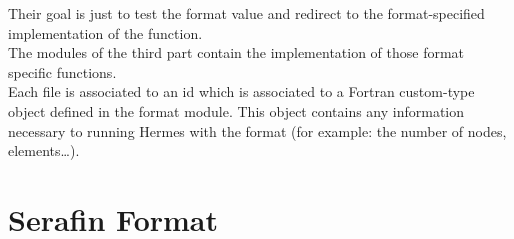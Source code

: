 %
Their goal is just to test the format value and redirect to the
format-specified implementation of the function.\\
%
The modules of the third part contain the implementation of those format
specific functions.\\
%
Each file is associated to an id which is associated to a Fortran custom-type
object defined in the format module. This object contains any information
necessary to running Hermes with the format (for example: the number of nodes,
elements\ldots).



%
\section{Serafin Format}
%

%
